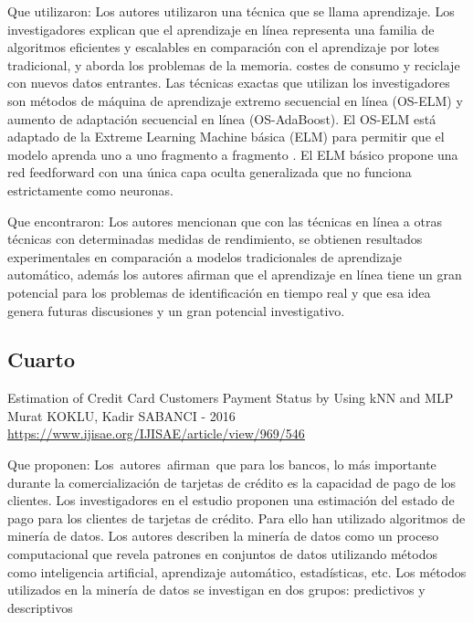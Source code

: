 \documentclass[12pt]{report}
\renewcommand{\_}{\kern-1.5pt\textunderscore\kern-1.5pt}
\begin{document}
\vspace{\baselineskip}

\vspace{\baselineskip}
Que utilizaron:
Los autores utilizaron una técnica que se llama aprendizaje. Los investigadores explican que el aprendizaje en línea representa una familia de algoritmos eficientes y escalables en comparación con el aprendizaje por lotes tradicional, y aborda los problemas de la memoria.
costes de consumo y reciclaje con nuevos datos entrantes.
Las técnicas exactas que utilizan los investigadores son métodos de máquina de aprendizaje extremo secuencial en línea (OS-ELM) y aumento de adaptación secuencial en línea (OS-AdaBoost). El OS-ELM está adaptado de la Extreme Learning Machine básica
(ELM) para permitir que el modelo aprenda uno a uno fragmento a fragmento . El ELM básico propone una red feedforward con una única capa oculta generalizada que no funciona estrictamente como neuronas.

\vspace{\baselineskip}
Que encontraron:
Los autores mencionan que con las técnicas en línea a otras técnicas con determinadas medidas de rendimiento, se obtienen resultados experimentales en comparación a modelos tradicionales de aprendizaje automático, además los autores afirman que el aprendizaje en línea tiene un gran potencial para los problemas de identificación en tiempo real y que esa idea genera futuras discusiones y un gran potencial investigativo.

\vspace{\baselineskip}

\vspace{\baselineskip}
\subsection{Cuarto}
Estimation of Credit Card Customers Payment Status by Using kNN and MLP
Murat KOKLU, Kadir SABANCI - 2016
\href{https://www.ijisae.org/IJISAE/article/view/969/546}{\textcolor[HTML]{1155CC}{\ul{https://www.ijisae.org/IJISAE/article/view/969/546}}}

\vspace{\baselineskip}
Que proponen: 
Los\ autores\ afirman\ que para los bancos, lo más importante durante la comercialización de tarjetas de crédito es la capacidad de pago de los clientes. Los investigadores en el estudio proponen una estimación del estado de pago para los clientes de tarjetas de crédito. Para ello  han utilizado algoritmos de minería de datos.  Los autores describen la minería de datos como  un proceso computacional que revela patrones en conjuntos de datos utilizando métodos como inteligencia artificial, aprendizaje automático, estadísticas, etc. Los métodos utilizados en la minería de datos se investigan en dos grupos: predictivos y descriptivos
\end{document}

